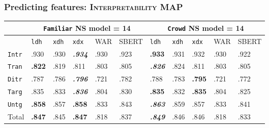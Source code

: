 \documentclass[xcolor={dvipsnames}]{beamer}
\newcommand{\feat}[1]{\textsc{#1}}
\newcommand{\param}[1]{\texttt{#1}}
\begin{document}
\begin{frame}
\frametitle{Predicting features: \feat{Interpretability} MAP}

\small

\begin{table}[htb!]
\begin{center}
\setlength{\tabcolsep}{.35em}
\begin{tabular}{|l||l|l|l||l|l||l|l|l||l|l|}
\hline
 & \multicolumn{5}{c||}{\param{Fam\-il\-iar} NS model = 14} & \multicolumn{5}{c|}{\param{Crowd} NS model = 14} \\
\hline
    		& \param{ldh}	& \param{xdh} &	\param{xdx} & WAR	& {\scriptsize SBERT} & \param{ldh}	& \param{xdh} &	\param{xdx} & WAR	& {\scriptsize SBERT} \\ \hline
\hline
\param{Intr}  & .930          & .930 & \textit{\textbf{.934}} & .930 & .923 & \textbf{.933}          & .931 & .932          & .930 & .922 \\ \hline
\param{Tran}  & \textbf{.822} & .819 & .811                   & .803 & .805 & \textit{\textbf{.826}} & .824 & .811          & .803 & .805 \\ \hline
\param{Ditr}  & .787          & .786 & \textit{\textbf{.796}} & .721 & .782 & .788                   & .783 & \textbf{.795} & .721 & .772 \\ \hline
\hline
\param{Targ}  & .835          & .833 & \textit{\textbf{.836}} & .804 & .830 & \textbf{.835}          & .832 & \textbf{.835} & .804 & .825 \\ \hline
\param{Untg}  & \textbf{.858} & .857 & \textbf{.858}          & .833 & .843 & \textit{\textbf{.863}} & .859 & .857          & .833 & .841 \\ \hline
\hline
Total & \textbf{.847} & .845 & \textbf{.847}          & .818 & .837 & \textit{\textbf{.849}} & .846 & .846          & .818 & .833 \\ \hline
\end{tabular}
\end{center}
\end{table}



\end{frame}
\end{document}
